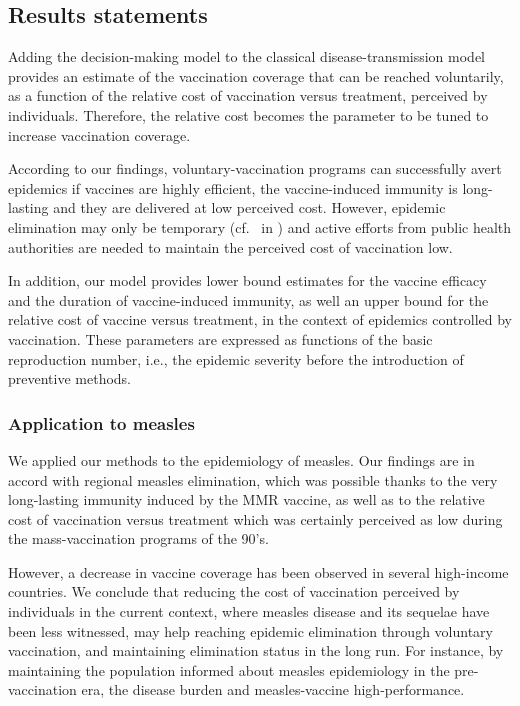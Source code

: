 \subsection{Results statements}
\label{Vaccine:Results}

Adding the decision-making model to the classical disease-transmission model provides an estimate of the vaccination coverage that can be reached voluntarily, as a function of the relative cost of vaccination versus treatment, perceived by individuals. Therefore, the relative cost becomes the parameter to be tuned to increase vaccination coverage.

According to our findings, voluntary-vaccination programs can successfully avert epidemics if vaccines are highly efficient, the vaccine-induced immunity is long-lasting and they are delivered at low perceived cost. However, epidemic elimination may only be temporary (cf.~ in ) and active efforts from public health authorities are needed to maintain the perceived cost of vaccination low. 

In addition, our model provides lower bound estimates for the vaccine efficacy and the duration of vaccine-induced immunity, as well an upper bound for the relative cost of vaccine versus treatment, in the context of epidemics controlled by vaccination. These parameters are expressed as functions of the basic reproduction number, i.e., the epidemic severity before the introduction of preventive methods. 




\subsubsection{Application to measles}
We applied our methods to the epidemiology of measles. Our findings are in accord with regional measles elimination, which was possible thanks to the very long-lasting immunity induced by the MMR vaccine, as well as to the relative cost of vaccination versus treatment which was certainly perceived as low during the mass-vaccination programs of the 90's. 

However, a decrease in vaccine coverage has been observed in several high-income countries. We conclude that reducing the cost of vaccination perceived by individuals in the current context, where measles disease and its sequelae have been less witnessed, may help reaching epidemic elimination through voluntary vaccination, and maintaining elimination status in the long run. For instance, by maintaining the population informed about measles epidemiology in the pre-vaccination era, the disease burden and measles-vaccine high-performance.

